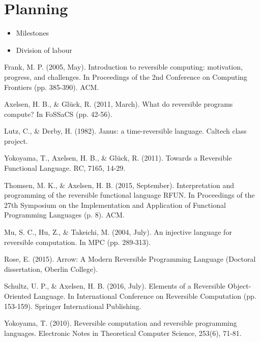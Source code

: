 \documentclass[12pt,a4paper]{article}
\begin{document}
\section{Planning}
\begin{itemize}
	\item{Milestones}
	\item{Division of labour}
\end{itemize}
\newpage
\begin{thebibliography}{99}
Frank, M. P. (2005, May). Introduction to reversible computing: motivation, progress, and challenges. In Proceedings of the 2nd Conference on Computing Frontiers (pp. 385-390). ACM.

Axelsen, H. B., \& Gl{\"u}ck, R. (2011, March). What do reversible programs compute? 
In FoSSaCS (pp. 42-56).

Lutz, C., \& Derby, H. (1982). Janus: a time-reversible language. Caltech class project.

Yokoyama, T., Axelsen, H. B., \& Glück, R. (2011). Towards a Reversible Functional Language. RC, 7165, 14-29.

Thomsen, M. K., \& Axelsen, H. B. (2015, September). Interpretation and programming of the reversible functional language RFUN. In Proceedings of the 27th Symposium on the Implementation and Application of Functional Programming Languages (p. 8). ACM.

Mu, S. C., Hu, Z., \& Takeichi, M. (2004, July). An injective language for reversible computation. In MPC (pp. 289-313).

Rose, E. (2015). Arrow: A Modern Reversible Programming Language (Doctoral dissertation, Oberlin College).

Schultz, U. P., \& Axelsen, H. B. (2016, July). Elements of a Reversible Object-Oriented Language. In International Conference on Reversible Computation (pp. 153-159). Springer International Publishing.

Yokoyama, T. (2010). Reversible computation and reversible programming languages. Electronic Notes in Theoretical Computer Science, 253(6), 71-81.

\end{thebibliography}
\end{document}
